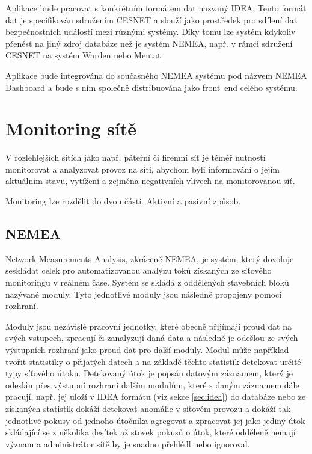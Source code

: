 Aplikace bude pracovat s konkrétním formátem dat nazvaný IDEA. Tento formát dat je specifikován sdružením CESNET a slouží jako prostředek pro sdílení dat bezpečnostních událostí mezi různými systémy. Díky tomu lze systém kdykoliv přenést na jiný zdroj databáze než je systém NEMEA, např. v rámci sdružení CESNET na systém Warden nebo Mentat.

Aplikace bude integrována do současného NEMEA systému pod názvem NEMEA Dashboard a bude s ním společně distribuována jako front~end celého systému.

\chapter{Monitoring sítě}

V rozlehlejších sítích jako např. páteřní či firemní síť je téměř nutností monitorovat a analyzovat provoz na síti, abychom byli informování o jejím aktuálním stavu, vytížení a zejména negativních vlivech na monitorovanou síť.

Monitoring lze rozdělit do dvou částí. Aktivní a pasivní způsob.

\section{NEMEA}

Network Measurements Analysis, zkráceně NEMEA, je systém, který dovoluje seskládat celek pro automatizovanou analýzu toků získaných ze síťového monitoringu v reálném čase. Systém se skládá z oddělených stavebních bloků nazývané moduly. Tyto jednotlivé moduly jsou následně propojeny pomocí rozhraní.

Moduly jsou nezávislé pracovní jednotky, které obecně přijímají proud dat na svých vstupech, zpracují či zanalyzují daná data a následně je odešlou ze svých výstupních rozhraní jako proud dat pro další moduly. Modul může například tvořit statistiky o přijatých datech a na základě těchto statistik detekovat určité typy síťového útoku. Detekovaný útok je popsán datovým záznamem, který je odeslán přes výstupní rozhraní dalším modulům, které s daným záznamem dále pracují, např. jej uloží v IDEA formátu (viz sekce \ref{sec:idea}) do databáze nebo ze získaných statistik dokáží detekovat anomálie v síťovém provozu a dokáží tak jednotlivé pokusy od jednoho útočníka agregovat a zpracovat jej jako jediný útok skládající se z několika desítek až stovek pokusů o útok, které odděleně nemají význam a administrátor sítě by je snadno přehlédl nebo ignoroval.

